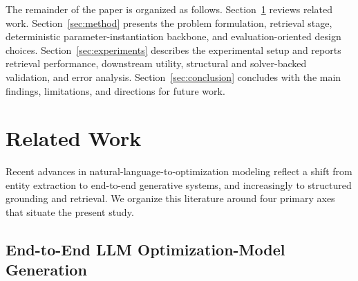 \documentclass[pdflatex,sn-basic,Numbered]{sn-jnl}
\begin{document}
The remainder of the paper is organized as follows. Section~\ref{sec:related_work} reviews related work. Section~\ref{sec:method} presents the problem formulation, retrieval stage, deterministic parameter-instantiation backbone, and evaluation-oriented design choices. Section~\ref{sec:experiments} describes the experimental setup and reports retrieval performance, downstream utility, structural and solver-backed validation, and error analysis. Section~\ref{sec:conclusion} concludes with the main findings, limitations, and directions for future work.

\section{Related Work}
\label{sec:related_work}

Recent advances in natural-language-to-optimization modeling reflect a shift from entity extraction to end-to-end generative systems, and increasingly to structured grounding and retrieval. We organize this literature around four primary axes that situate the present study.

\subsection{End-to-End LLM Optimization-Model Generation}
\label{subsec:rw_llm_generation}
\end{document}
